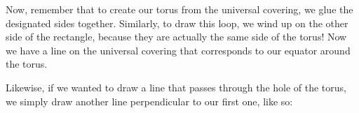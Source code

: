 \documentclass[12pt,a4paper,reqno,parskip=full]{amsart}
\numberwithin{equation}{section}
\theoremstyle{plain}
\theoremstyle{definition}
\begin{document}
{\begin{minipage}{1.75in}
{}
\end{minipage}}

Now, remember that to create our torus from the universal covering, we glue the designated sides together. Similarly, to draw this loop, we wind up on the other side of the rectangle, because they are actually the same side of the torus! Now we have a line on the universal covering that corresponds to our equator around the torus. 

Likewise, if we wanted to draw a line that passes through the hole of the torus, we simply draw another line perpendicular to our first one, like so:\\
\end{document}
